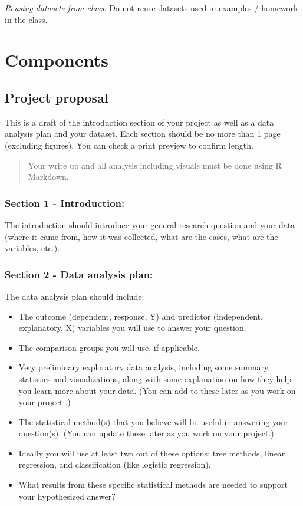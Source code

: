 \documentclass[
]{book}
\providecommand{\tightlist}{%
  \setlength{\itemsep}{0pt}\setlength{\parskip}{0pt}}
\begin{document}
\emph{Reusing datasets from class:} Do not reuse datasets used in examples / homework in the
class.

\hypertarget{components}{%
\section{Components}\label{components}}

\hypertarget{project-proposal}{%
\subsection{Project proposal}\label{project-proposal}}

This is a draft of the introduction section of your project as well as a
data analysis plan and your dataset. Each section should be no more than 1
page (excluding figures). You can check a print preview to confirm length.

\begin{quote}
Your write up and all analysis including visuals must be done using R Markdown.
\end{quote}

\hypertarget{section-1---introduction}{%
\subsubsection{Section 1 - Introduction:}\label{section-1---introduction}}

The introduction should introduce your general research
question and your data (where it came from, how it was collected, what
are the cases, what are the variables, etc.).

\hypertarget{section-2---data-analysis-plan}{%
\subsubsection{Section 2 - Data analysis plan:}\label{section-2---data-analysis-plan}}

The data analysis plan should include:

\begin{itemize}
\tightlist
\item
  The outcome (dependent, response, Y) and predictor (independent, explanatory, X)
  variables you will use to answer your question.
\item
  The comparison groups you will use, if applicable.
\item
  Very preliminary exploratory data analysis, including some summary statistics and
  visualizations, along with some explanation on how they help you learn more about your data.
  (You can add to these later as you work on your project..)
\item
  The statistical method(s) that you believe will be useful in answering your question(s).
  (You can update these later as you work on your project.)
\item
  Ideally you will use at least two out of these options: tree methods, linear regression,
  and classification (like logistic regression).
\item
  What results from these specific statistical methods are needed to support your
  hypothesized answer?
\end{itemize}
\end{document}
